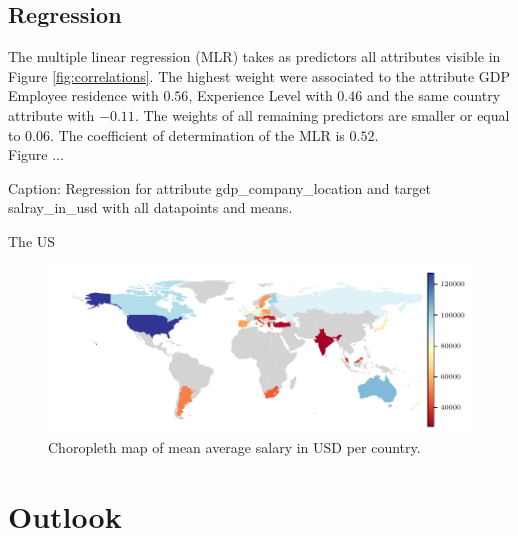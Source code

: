 \documentclass{article}
\begin{document}
\subsection{Regression}
The multiple linear regression (MLR) takes as predictors all attributes visible in Figure \ref{fig:correlations}. The highest weight were associated to the attribute GDP Employee residence with $0.56$, Experience Level with $0.46$ and the same country attribute with $-0.11$. The weights of all remaining predictors are smaller or equal to $0.06$. The coefficient of determination of the MLR is $0.52$.\\

Figure ... 

Caption: Regression for attribute gdp\_company\_location and target salray\_in\_usd with all datapoints and means. 

The US




\begin{figure}[ht]
    \centering
    \includegraphics{choropleth.pdf}
    \caption{Choropleth map of mean average salary in USD per country.}
    \label{fig:choropleth}
\end{figure}


\section{Outlook}



\end{document}
